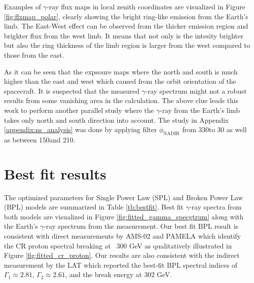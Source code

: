 Examples of $\gamma$-ray flux maps in local zenith coordinates
are visualized in Figure \ref{fig:flxmap_polar}, clearly showing
the bright ring-like emission from the Earth's limb.
The East-West effect can be observed from the thicker emission region
and brighter flux from the west limb.
It means that not only is the intesity brighter
but also the ring thickness
of the limb region is larger from the west compared to those from the east.


As it can be seen that the expsoure maps where the north and south is 
much higher than the east and west which caused from the orbit 
orientation of the spacecraft. It is suspected 
that the measured $\gamma$-ray spectrum might not a robust results 
from some vanishing area in the calculation. The above clue leads
this work to perform another parallel study where the $\gamma$-ray 
from the Earth's limb takes only north and south direction into account.
The study in Appendix \ref{appendix:ns_analysis} was done by applying 
filter $\phi_\text{NADIR}$ from 330\textdegree to 30 \textdegree
as well as between 150\textdegree and 210\textdegree.


\section{Best fit results}

The optimized parameters for Single Power Law (SPL)
and Broken Power Law (BPL) models are summarized in 
Table \ref{tb:bestfit}. Best fit $\gamma$-ray 
spectra from both models are
visualized in Figure \ref{fig:fitted_gamma_specgtrum} along
with the Earth's $\gamma$-ray spectrum from the measurement.
Our best fit BPL result is consistent with direct measurements
by AMS-02 \citep{AMS02pr2015} and PAMELA \citep{adriani2011pamela}
which identify
the CR proton spectral breaking at ~300 GeV as qualitatively
illustrated in Figure \ref{fig:fitted_cr_proton}.
Our results are also consistent with the indirect measurement
by the LAT \cite{FermiEarth14} which reported the best-fit BPL spectral
indices of $\Gamma_1\approx2.81$, $\Gamma_2\approx2.61$,
and the break energy at 302 GeV.

